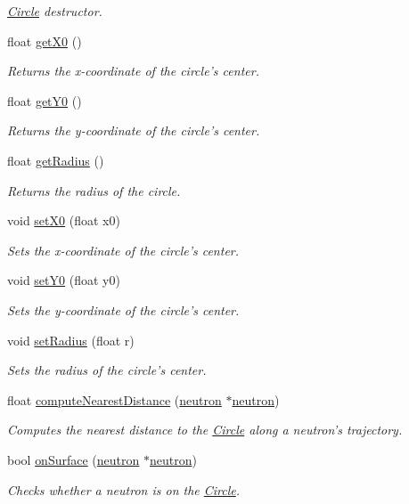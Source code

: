 \begin{DoxyCompactItemize}
\begin{DoxyCompactList}\small\item\em \hyperlink{classCircle}{Circle} destructor. \end{DoxyCompactList}\item 
float \hyperlink{classCircle_a58d56d258764265600e8c27ecf5c02df}{get\-X0} ()
\begin{DoxyCompactList}\small\item\em Returns the x-\/coordinate of the circle's center. \end{DoxyCompactList}\item 
float \hyperlink{classCircle_ae75c0d7cabbfdd09546ca467ae8a8497}{get\-Y0} ()
\begin{DoxyCompactList}\small\item\em Returns the y-\/coordinate of the circle's center. \end{DoxyCompactList}\item 
float \hyperlink{classCircle_af31f99d2b0d545a0daa936384f5abf6b}{get\-Radius} ()
\begin{DoxyCompactList}\small\item\em Returns the radius of the circle. \end{DoxyCompactList}\item 
void \hyperlink{classCircle_a26f477fd0b422f630d291e7dd1f01d4e}{set\-X0} (float x0)
\begin{DoxyCompactList}\small\item\em Sets the x-\/coordinate of the circle's center. \end{DoxyCompactList}\item 
void \hyperlink{classCircle_aa8a2aabeb95db6b8f7665e2ce21af7ff}{set\-Y0} (float y0)
\begin{DoxyCompactList}\small\item\em Sets the y-\/coordinate of the circle's center. \end{DoxyCompactList}\item 
void \hyperlink{classCircle_af2e568fbc6274720cade0c11521f8fa1}{set\-Radius} (float r)
\begin{DoxyCompactList}\small\item\em Sets the radius of the circle's center. \end{DoxyCompactList}\item 
float \hyperlink{classCircle_a566afb2538f5cae0b863ab3cf6e1f1ab}{compute\-Nearest\-Distance} (\hyperlink{structneutron}{neutron} $\ast$\hyperlink{structneutron}{neutron})
\begin{DoxyCompactList}\small\item\em Computes the nearest distance to the \hyperlink{classCircle}{Circle} along a neutron's trajectory. \end{DoxyCompactList}\item 
bool \hyperlink{classCircle_a129caa61e522c6f0abbbfe5d5d4e7534}{on\-Surface} (\hyperlink{structneutron}{neutron} $\ast$\hyperlink{structneutron}{neutron})
\begin{DoxyCompactList}\small\item\em Checks whether a neutron is on the \hyperlink{classCircle}{Circle}. \end{DoxyCompactList}\end{DoxyCompactItemize}
